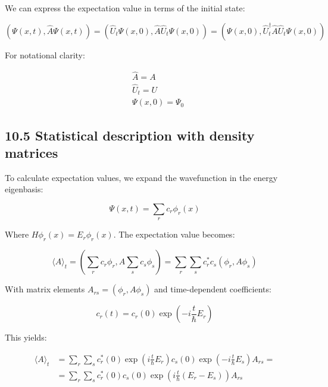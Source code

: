 \documentclass[italian]{HKNdocument}
\begin{document}
We can express the expectation value in terms of the initial state:

\begin{equation*}
(\Psi(x, t), \hat{A} \Psi(x, t))=\left(\hat{U}_{t} \Psi(x, 0), \hat{A} \hat{U}_{t} \Psi(x, 0)\right)=\left(\Psi(x, 0), \hat{U}_{t}^{\dagger} \hat{A} \hat{U}_{t} \Psi(x, 0)\right) \tag{10.30}
\end{equation*}

For notational clarity:

\begin{align*}
& \hat{A}=A \\
& \hat{U}_{t}=U  \tag{10.31}\\
& \Psi(x, 0)=\Psi_{0}
\end{align*}

\subsection*{10.5 Statistical description with density matrices}
To calculate expectation values, we expand the wavefunction in the energy eigenbasis:

\begin{equation*}
\Psi(x, t)=\sum_{r} c_{r} \phi_{r}(x) \tag{10.32}
\end{equation*}

Where $H \phi_{r}(x)=E_{r} \phi_{r}(x)$. The expectation value becomes:

\begin{equation*}
\langle A\rangle_{t}=\left(\sum_{r} c_{r} \phi_{r}, A \sum_{s} c_{s} \phi_{s}\right)=\sum_{r} \sum_{s} c_{r}^{*} c_{s}\left(\phi_{r}, A \phi_{s}\right) \tag{10.33}
\end{equation*}

With matrix elements $A_{rs} = (\phi_r, A\phi_s)$ and time-dependent coefficients:

\begin{equation*}
c_{r}(t)=c_{r}(0) \exp \left(-i \frac{t}{\hbar} E_{r}\right) \tag{10.34}
\end{equation*}

This yields:

\begin{align*}
\langle A\rangle_{t} & =\sum_{r} \sum_{s} c_{r}^{*}(0) \exp \left(i \frac{t}{\hbar} E_{r}\right) c_{s}(0) \exp \left(-i \frac{t}{\hbar} E_{s}\right) A_{r s}= \\
& =\sum_{r} \sum_{s} c_{r}^{*}(0) c_{s}(0) \exp \left(i \frac{t}{\hbar}\left(E_{r}-E_{s}\right)\right) A_{r s} \tag{10.35}
\end{align*}
\end{document}
